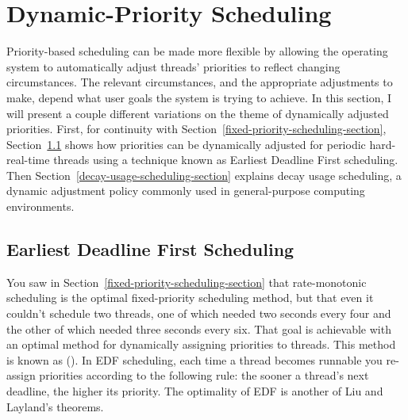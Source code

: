 \section{Dynamic-Priority Scheduling}\label{dynamic-priority-scheduling-section}
Priority-based scheduling can be made more flexible by allowing the
operating system to automatically adjust threads' priorities to
reflect changing circumstances.  The relevant circumstances, and the
appropriate adjustments to make, depend what user goals the system is
trying to achieve.  In this section, I will present a couple different
variations on the theme of dynamically adjusted priorities.  First, for
continuity with Section~\ref{fixed-priority-scheduling-section},
Section~\ref{EDF-section} shows how priorities can
be dynamically adjusted for periodic hard-real-time threads using a
technique known as Earliest Deadline First scheduling.  Then
Section~\ref{decay-usage-scheduling-section} explains decay usage
scheduling, a dynamic adjustment policy commonly used in
general-purpose computing environments.

\subsection{Earliest Deadline First Scheduling}\label{EDF-section}
You saw in Section~\ref{fixed-priority-scheduling-section} that rate-monotonic scheduling is the
optimal fixed-priority scheduling method, but that even it couldn't
schedule two threads, one of which needed two seconds every four and
the other of which needed three seconds every six.  That goal is achievable
with an optimal method for dynamically assigning priorities to
threads.  This method is known as  ().  In EDF scheduling,
each time a thread becomes runnable you re-assign priorities
according to the following rule: the sooner a thread's next deadline,
the higher its priority.  The optimality of EDF is another of Liu and
Layland's theorems.

